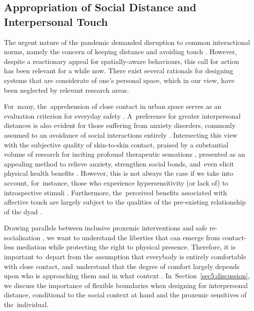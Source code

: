 {\subsection*{Appropriation of Social Distance and Interpersonal Touch}
\label{subsec:safety}

The urgent nature of the pandemic demanded disruption to common interactional norms, namely the concern of keeping distance and avoiding touch \citep{long_covid-19_2021,katila_interaction_2020}. However, despite a reactionary appeal for spatially-aware behaviours, this call for action has been relevant for a while now. There exist several rationals for designing systems that are considerate of one's personal space, which in our view, have been neglected by relevant research areas.

For~many, the~apprehension of close contact in urban space serves as an evaluation criterion for everyday safety \citep{farina_moving_2021,peimani_where_2016}. A~preference for greater interpersonal distances is also evident for those suffering from anxiety disorders, commonly assumed to an avoidance of social interactions entirely \citep{givon-benjio_biased_2020}. Intersecting this view with the subjective quality of skin-to-skin contact, praised by a substantial volume of research for inciting profound therapeutic sensations \citep{crucianelli_developmental_2020}, presented as an appealing method to relieve anxiety, strengthen social bonds, and~even elicit physical health benefits \citep{field_touch_2010,peterson_parents_2007,dolin_reach_1993}. However, this is not always the case if we take into account, for~instance, those who experience hypersensitivity (or lack of) to introspective stimuli \citep{bischoff-grethe_neural_2018,sivik_alexithymia_1993}. Furthermore, the~perceived benefits associated with affective touch are largely subject to the qualities of the pre-existing relationship of the dyad \citep{gulledge2007non}.

Drawing parallels between inclusive proxemic interventions and safe re-socialisation \citep{long_covid-19_2021}, we want to understand the liberties that can emerge from contact-less mediation while protecting the right to physical presence. Therefore, it is important to~depart from the assumption that everybody is entirely comfortable with close contact, and~understand that the degree of comfort largely depends upon who is approaching them and in what context \citep{matsumoto_gender_2016,suvilehto_topography_2015}. In~Section~\ref{sec5:discussion}, we discuss the importance of flexible boundaries when designing for interpersonal distance, conditional to the social context at hand and the proxemic sensitives of the~individual.

}
